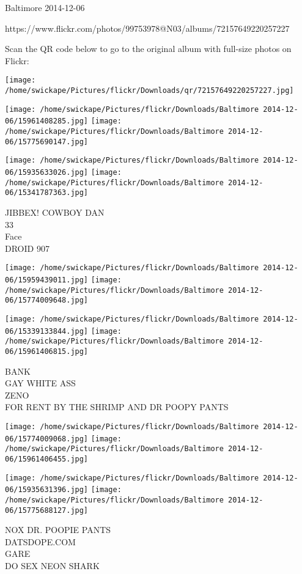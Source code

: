 \documentclass[10pt,letterpaper]{article}
\begin{document}
Baltimore 2014-12-06

https://www.flickr.com/photos/99753978@N03/albums/72157649220257227

Scan the QR code below to go to the original album with full-size photos on Flickr:

\texttt{[image: /home/swickape/Pictures/flickr/Downloads/qr/72157649220257227.jpg]}
\pagebreak

\texttt{[image: /home/swickape/Pictures/flickr/Downloads/Baltimore 2014-12-06/15961408285.jpg]}
\texttt{[image: /home/swickape/Pictures/flickr/Downloads/Baltimore 2014-12-06/15775690147.jpg]}

\texttt{[image: /home/swickape/Pictures/flickr/Downloads/Baltimore 2014-12-06/15935633026.jpg]}
\texttt{[image: /home/swickape/Pictures/flickr/Downloads/Baltimore 2014-12-06/15341787363.jpg]}

JIBBEX! COWBOY DAN\\
33\\
Face\\
DROID 907
\pagebreak

\texttt{[image: /home/swickape/Pictures/flickr/Downloads/Baltimore 2014-12-06/15959439011.jpg]}
\texttt{[image: /home/swickape/Pictures/flickr/Downloads/Baltimore 2014-12-06/15774009648.jpg]}

\texttt{[image: /home/swickape/Pictures/flickr/Downloads/Baltimore 2014-12-06/15339133844.jpg]}
\texttt{[image: /home/swickape/Pictures/flickr/Downloads/Baltimore 2014-12-06/15961406815.jpg]}

BANK\\
GAY WHITE ASS\\
ZENO\\
FOR RENT BY THE SHRIMP AND DR POOPY PANTS
\pagebreak

\texttt{[image: /home/swickape/Pictures/flickr/Downloads/Baltimore 2014-12-06/15774009068.jpg]}
\texttt{[image: /home/swickape/Pictures/flickr/Downloads/Baltimore 2014-12-06/15961406455.jpg]}

\texttt{[image: /home/swickape/Pictures/flickr/Downloads/Baltimore 2014-12-06/15935631396.jpg]}
\texttt{[image: /home/swickape/Pictures/flickr/Downloads/Baltimore 2014-12-06/15775688127.jpg]}

NOX DR. POOPIE PANTS\\
DATSDOPE.COM\\
GARE\\
DO SEX NEON SHARK
\pagebreak
\end{document}
